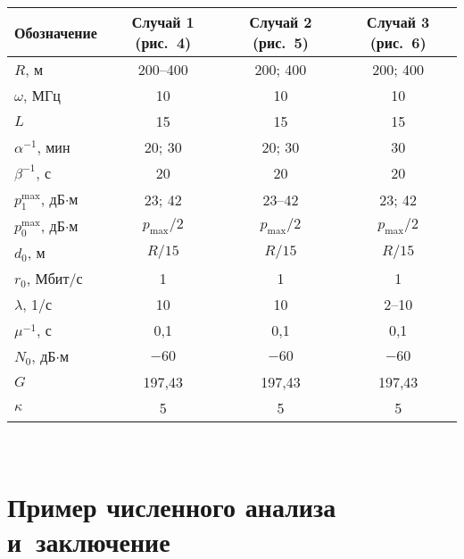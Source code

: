 \begin{multicols}{2}
\begin{table*}
\begin{center}
  \begin{tabular}{|l|c|c|c|}
  \hline
\multicolumn{1}{|c|}{Обозначение}&Случай 1  
(рис.~4)&Случай 2  
(рис.~5)&Случай 3  
(рис.~6)\\
\hline
$R$, м&200--400&200; 400&200; 400\\
$\omega$, МГц&10&10&10\\
$L$&15&15&15\\
$\alpha^{-1}$, мин&20; 30&20; 30&30\\
$\beta^{-1}$, с&20&20&20\\
$p_1^{\max}$, дБ$\cdot$м&23; 42&23--42&23; 42\\
$p_0^{\max}$, дБ$\cdot$м&$p_{\max}/2$&$p_{\max}/2$&$p_{\max}/2$\\
$d_0$, м&$R/15$&$R/15$&$R/15$\\
$r_0$, Мбит/с&1&1&1\\
$\lambda$, 1/с&10&10&2--10\\
$\mu^{-1}$, с&0,1&0,1&0,1\\
$N_0$, дБ$\cdot$м&$-60$&$-60$&$-60$\\
$G$&197,43&197,43&197,43\\
$\kappa$&5&5&5\\
\hline
\end{tabular}
\end{center}
\end{table*}
\begin{figure*}[b] %
\begin{center}
\mbox{%
\epsfxsize=162.099mm
}
\end{center}
\vspace*{-9pt}
\end{figure*}

\vspace*{-9pt}

\section{Пример численного анализа и~заключение}

\vspace*{-3pt}


\end{multicols}
